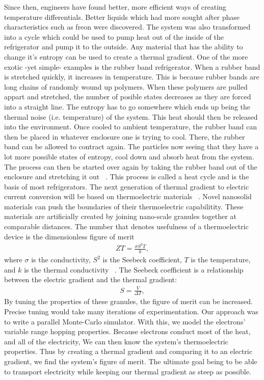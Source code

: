	Since then, engineers have found better, more efficient ways of creating temperature differentials. Better liquids which had more sought after phase characteristics such as freon were discovered. The system was also transformed into a cycle which could be used to pump heat out of the inside of the refrigerator and pump it to the outside. Any material that has the ability to change it's entropy can be used to create a thermal gradient. One of the more exotic -yet simple- examples is the rubber band refrigerator. When a rubber band is stretched quickly, it increases in temperature. This is because rubber bands are long chains of randomly wound up polymers. When these polymers are pulled appart and stretched, the number of posible states decreases as they are forced into a straight line. The entropy has to go somewhere which ends up being the thermal noise (i.e. temperature) of the system. This heat should then be released into the environment. Once cooled to ambient temperature, the rubber band can then be placed in whatever enclosure one is trying to cool. There, the rubber band can be allowed to contract again. The particles now seeing that they have a lot more possible states of entropy, cool down and absorb heat from the system. The process can then be started over again by taking the rubber band out of the enclosure and stretching it out ~\cite{Brown63}. This process is called a heat cycle and is the basis of most refrigerators. 
        The next generation of thermal gradient to electric current conversion will be based on thermoelectric materials ~\cite{Sparks16}. Novel nanosolid materials can push the boundaries of their thermoelectric capabilitity. These materials are artificially created by joining nano-scale granules together at comparable distances. The number that denotes usefulness of a thermoelectric device is the dimensionless figure of merit
\begin{eqnarray}
ZT = \frac{\sigma S^2 T}{k},
\label{ZT}
\end{eqnarray}
where $\sigma$ is the conductivity, $S^2$ is the Seebeck coefficient, $T$ is the temperature, and $k$ is the thermal conductivity ~\cite{chen}. The Seebeck coefficient is a relationship between the electric gradient and the thermal gradient:
\begin{eqnarray}
S = \frac{V}{\Delta T},
\label{Seebeck}
\end{eqnarray}
 By tuning the properties of these granules, the figure of merit can be increased. Precise tuning would take many iterations of experimentation. Our approach was to write a parallel Monte-Carlo simulator. With this, we model the electrons' variable range hopping properties. Because electrons conduct most of the heat, and all of the electricity, We can then know the system's thermoelectric properties. Thus by creating a thermal gradient and comparing it to an electric gradient, we find the system's figure of merit. The ultimate goal being to be able to transport electricity while keeping our thermal gradient as steep as possible. 

